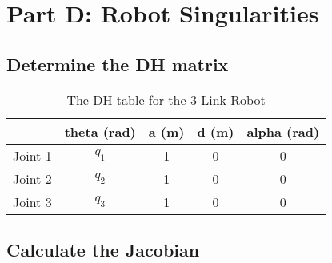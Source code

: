 \section{Part D: Robot Singularities}
\subsection{Determine the DH matrix}
\begin{table}[H]
    \centering
    \begin{tabular}{|c|c|c|c|c|}
        \hline
                & \textbf{theta (rad)} & \textbf{a (m)} & \textbf{d (m)} & \textbf{alpha (rad)} \\ \hline
        Joint 1 & $q_{1}$              & 1              & 0              & 0                    \\ \hline
        Joint 2 & $q_{2}$              & 1              & 0              & 0                    \\ \hline
        Joint 3 & $q_{3}$              & 1              & 0              & 0                    \\ \hline
    \end{tabular}
    \caption{The DH table for the 3-Link Robot}
    \label{table:3-Link Robot}
\end{table}
\subsection{Calculate the Jacobian}

